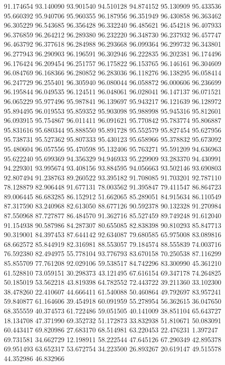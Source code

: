 91.174654
93.140090
93.901540
94.510128
94.874152
95.130909
95.433536
95.660392
95.940706
95.960355
96.187956
96.351949
96.430858
96.363462
96.305229
96.543685
96.356428
96.332240
96.485621
96.454218
96.407933
96.376859
96.264212
96.289380
96.232220
96.348730
96.237932
96.457747
96.463792
96.377618
96.284988
96.293668
96.099364
96.299732
96.343801
96.277943
96.290903
96.196591
96.302946
96.222835
96.202381
96.174496
96.176424
96.209454
96.251757
96.175822
96.153765
96.146161
96.304609
96.084769
96.168366
96.280852
96.283036
96.118276
96.138295
96.058414
96.247729
96.255401
96.305940
96.080044
96.058872
96.000606
96.236699
96.195844
96.049535
96.124511
96.048061
96.028041
96.147137
96.071521
96.065229
95.977496
95.987841
96.139697
95.943217
96.121639
96.128972
95.894495
96.019553
95.859352
95.903098
95.988998
95.945316
95.812601
96.093915
95.754867
96.011411
96.091621
95.770842
95.783774
95.806887
95.831616
95.680344
95.888550
95.891728
95.552579
95.827454
95.627956
95.738731
95.527362
95.807333
95.430123
95.658966
95.378832
95.673092
95.480604
96.057556
95.470598
95.132406
95.763271
95.591209
94.636963
95.622240
95.699369
94.356329
94.946933
95.229909
93.283370
94.430991
94.229301
93.995674
93.408156
93.884595
94.056663
93.502146
93.690803
92.807494
91.238763
89.260522
93.395182
91.708085
91.703201
92.787110
78.128879
82.906448
91.677131
78.003562
91.395847
79.411547
86.864723
89.006445
86.683285
86.152912
51.662065
85.289051
84.915634
86.110549
87.317590
83.240968
82.613050
88.677126
90.592378
90.132328
91.270984
87.550968
87.727877
86.484570
91.362716
85.527459
89.749248
91.612040
91.154938
90.587986
84.287307
80.655085
82.838398
90.810293
85.847713
90.319001
84.397453
87.644142
92.634087
79.680585
65.975008
83.089816
68.662572
85.844919
82.316981
88.553057
79.184574
88.555839
74.003716
76.592380
82.494975
55.778104
93.776793
83.670158
70.250538
87.116299
85.855709
77.761208
92.029106
59.538517
84.742296
83.300990
45.361210
61.528810
73.059151
30.298373
43.121495
67.616154
69.347178
74.264825
50.185019
53.562218
43.819398
64.782552
72.443722
39.211360
33.102300
38.478260
22.410607
44.666411
61.540088
50.460864
49.792697
83.957241
59.840877
61.164606
39.454918
60.091959
55.278954
56.362615
36.047650
68.355559
40.374573
61.722486
59.051505
40.141009
38.851104
65.643727
18.134708
47.371990
69.352732
51.172873
33.832938
51.810671
50.083091
60.443417
69.820986
27.683170
68.514981
63.220453
22.476231
1.397247
69.731581
34.662729
12.198911
58.222544
47.645126
67.290349
42.895378
69.951493
63.652317
53.672754
34.223500
26.893267
20.619147
49.515578
44.352986
46.832966
